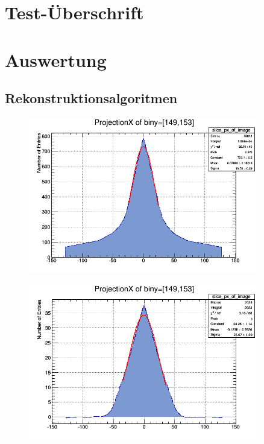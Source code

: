 \section{Test-Überschrift}
\section{Auswertung}
\subsection{Rekonstruktionsalgoritmen}
\begin{figure}[h!]
	\centering
	\includegraphics[width=0.9\textwidth]{Ohne-Filter.png}
	\caption{}
	\label{}
\end{figure}
\begin{figure}[h!]
	\centering
	\includegraphics[width=0.9\textwidth]{Hann-Filter.png}
	\caption{}
	\label{}
\end{figure}
